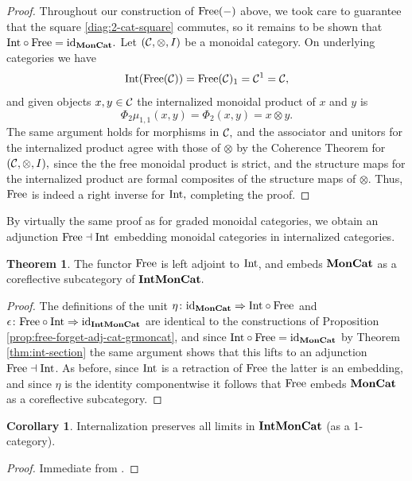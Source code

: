 \documentclass[openany, amssymb, psamsfonts]{amsart}
\theoremstyle{definition}
\newtheorem{thm}{Theorem}[section]
\newtheorem{cor}{Corollary}[section]
\numberwithin{equation}{section}
\begin{document}
\begin{proof}
Throughout our construction of $\mathrm{Free}(-)$ above, we took care to guarantee that the square \eqref{diag:2-cat-square} commutes, so it remains to be shown that $\mathrm{Int} \circ \mathrm{Free} = \mathrm{id}_{\textbf{\textup{MonCat}}}.$ Let $(\mathcal{C}, \otimes, I)$ be a monoidal category. On underlying categories we have
\begin{equation*}
\mathrm{Int}(\mathrm{Free}(\mathcal{C})) = \mathrm{Free}(\mathcal{C})_1 = \mathcal{C}^1 = \mathcal{C},
\end{equation*} and given objects $x, y \in \mathcal{C}$ the internalized monoidal product of $x$ and $y$ is
\begin{equation*}
\Phi_2\mu_{1,1}(x, y) = \Phi_2(x, y) = x \otimes y.
\end{equation*} The same argument holds for morphisms in $\mathcal{C},$ and the associator and unitors for the internalized product agree with those of $\otimes$ by the Coherence Theorem for $(\mathcal{C}, \otimes, I),$ since the the free monoidal product is strict, and the structure maps for the internalized product are formal composites of the structure maps of $\otimes.$ Thus, $\mathrm{Free}$ is indeed a right inverse for $\mathrm{Int},$ completing the proof.
\end{proof}

By virtually the same proof as for graded monoidal categories, we obtain an adjunction $\mathrm{Free} \dashv \mathrm{Int}$ embedding monoidal categories in internalized categories.

\begin{thm} \label{thm:free-forget-adj-mon-int}
The functor $\mathrm{Free}$ is left adjoint to $\mathrm{Int}$, and embeds $\textbf{\textup{MonCat}}$ as a coreflective subcategory of $\textbf{\textup{IntMonCat}}.$
\end{thm}
\begin{proof}
The definitions of the unit $\eta \colon \mathrm{id}_{\textbf{\textup{MonCat}}}\Rightarrow \mathrm{Int} \circ \mathrm{Free}$ and $\epsilon \colon \mathrm{Free} \circ \mathrm{Int} \Rightarrow \mathrm{id}_{\textbf{\textup{IntMonCat}}}$ are identical to the constructions of Proposition \ref{prop:free-forget-adj-cat-grmoncat}, and since $\mathrm{Int} \circ \mathrm{Free} = \mathrm{id}_{\textbf{\textup{MonCat}}}$ by Theorem \ref{thm:int-section} the same argument shows that this lifts to an adjunction $\mathrm{Free} \dashv \mathrm{Int}$. As before, since $\mathrm{Int}$ is a retraction of $\mathrm{Free}$ the latter is an embedding, and since $\eta$ is the identity componentwise it follows that $\mathrm{Free}$ embeds $\textbf{\textup{MonCat}}$ as a coreflective subcategory.
\end{proof}

\begin{cor}
Internalization preserves all limits in $\textbf{\textup{IntMonCat}}$ (as a 1-category).
\end{cor}
\begin{proof}
Immediate from .
\end{proof}
\end{document}
